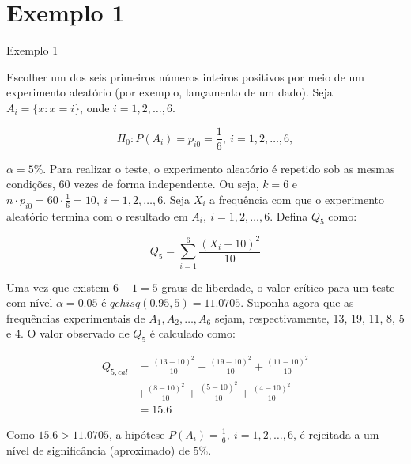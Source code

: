 \documentclass[12pt]{beamer}
\begin{document}
\section{Exemplo 1}
\begin{frame}{Exemplo 1}
\begin{block}{}
\justifying
Escolher um dos seis primeiros números inteiros positivos por meio de um experimento aleatório (por exemplo, lançamento de um dado). Seja $A_i = \{x : x = i\}$, onde $i = 1, 2, \ldots, 6$. 

$$H_0 : P(A_i) = p_{i0} = \frac{1}{6},~i = 1, 2, \ldots, 6,$$ 

$\alpha=5\%$. Para realizar o teste, o experimento aleatório é repetido sob as mesmas condições, 60 vezes de forma independente. Ou seja, $k = 6$ e $n \cdot p_{i0} = 60 \cdot \frac{1}{6} = 10,~i = 1, 2, \ldots, 6$. Seja $X_i$ a frequência com que o experimento aleatório termina com o resultado em $A_i,~i = 1, 2, \ldots, 6$. Defina $Q_5$ como:

\[
Q_5 = \sum_{i=1}^{6} \frac{(X_i - 10)^2}{10}
\]

\end{block}
\end{frame}

\begin{frame}{}
\begin{block}{}
\justifying
Uma vez que existem $6 - 1 = 5$ graus de liberdade, o valor crítico para um teste com nível $\alpha = 0.05$ é $qchisq(0.95, 5) = 11.0705$. Suponha agora que as frequências experimentais de $A_1, A_2, \ldots, A_6$ sejam, respectivamente, 13, 19, 11, 8, 5 e 4. O valor observado de $Q_5$ é calculado como:

\begin{align*}
Q_{5,cal} &= \frac{(13 - 10)^2}{10} + \frac{(19 - 10)^2}{10} + \frac{(11 - 10)^2}{10}\\ 
&+ \frac{(8 - 10)^2}{10} + \frac{(5 - 10)^2}{10} + \frac{(4 - 10)^2}{10}\\ 
&= 15.6
\end{align*}

Como $15.6 > 11.0705$, a hipótese $P(A_i) = \frac{1}{6},~i = 1, 2, \ldots, 6$, é rejeitada a um nível de significância (aproximado) de $5\%.$
\end{block}
\end{frame}
\end{document}
